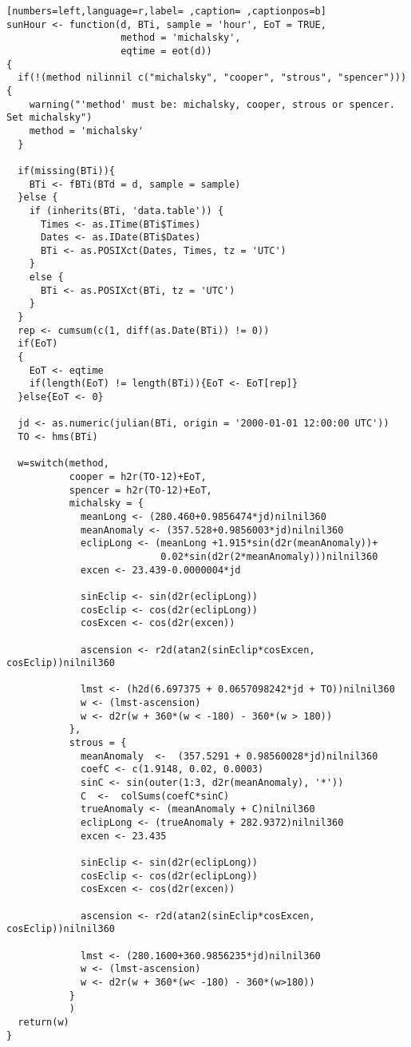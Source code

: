 \begin{lstlisting}[numbers=left,language=r,label= ,caption= ,captionpos=b]
sunHour <- function(d, BTi, sample = 'hour', EoT = TRUE,
                    method = 'michalsky',
                    eqtime = eot(d))
{
  if(!(method nilinnil c("michalsky", "cooper", "strous", "spencer"))){
    warning("'method' must be: michalsky, cooper, strous or spencer.
Set michalsky")
    method = 'michalsky'
  }

  if(missing(BTi)){
    BTi <- fBTi(BTd = d, sample = sample)
  }else {
    if (inherits(BTi, 'data.table')) {
      Times <- as.ITime(BTi$Times)
      Dates <- as.IDate(BTi$Dates)
      BTi <- as.POSIXct(Dates, Times, tz = 'UTC')
    }
    else {
      BTi <- as.POSIXct(BTi, tz = 'UTC')
    }   
  }
  rep <- cumsum(c(1, diff(as.Date(BTi)) != 0))
  if(EoT)
  {
    EoT <- eqtime
    if(length(EoT) != length(BTi)){EoT <- EoT[rep]}
  }else{EoT <- 0}

  jd <- as.numeric(julian(BTi, origin = '2000-01-01 12:00:00 UTC'))
  TO <- hms(BTi)

  w=switch(method,
           cooper = h2r(TO-12)+EoT,
           spencer = h2r(TO-12)+EoT,
           michalsky = {
             meanLong <- (280.460+0.9856474*jd)nilnil360
             meanAnomaly <- (357.528+0.9856003*jd)nilnil360
             eclipLong <- (meanLong +1.915*sin(d2r(meanAnomaly))+
                           0.02*sin(d2r(2*meanAnomaly)))nilnil360
             excen <- 23.439-0.0000004*jd

             sinEclip <- sin(d2r(eclipLong))
             cosEclip <- cos(d2r(eclipLong))
             cosExcen <- cos(d2r(excen))

             ascension <- r2d(atan2(sinEclip*cosExcen, cosEclip))nilnil360

             lmst <- (h2d(6.697375 + 0.0657098242*jd + TO))nilnil360
             w <- (lmst-ascension)
             w <- d2r(w + 360*(w < -180) - 360*(w > 180))
           },
           strous = {
             meanAnomaly  <-  (357.5291 + 0.98560028*jd)nilnil360
             coefC <- c(1.9148, 0.02, 0.0003)
             sinC <- sin(outer(1:3, d2r(meanAnomaly), '*'))
             C  <-  colSums(coefC*sinC)
             trueAnomaly <- (meanAnomaly + C)nilnil360
             eclipLong <- (trueAnomaly + 282.9372)nilnil360
             excen <- 23.435

             sinEclip <- sin(d2r(eclipLong))
             cosEclip <- cos(d2r(eclipLong))
             cosExcen <- cos(d2r(excen))

             ascension <- r2d(atan2(sinEclip*cosExcen, cosEclip))nilnil360

             lmst <- (280.1600+360.9856235*jd)nilnil360
             w <- (lmst-ascension)
             w <- d2r(w + 360*(w< -180) - 360*(w>180))
           }
           )
  return(w)
}
\end{lstlisting}
